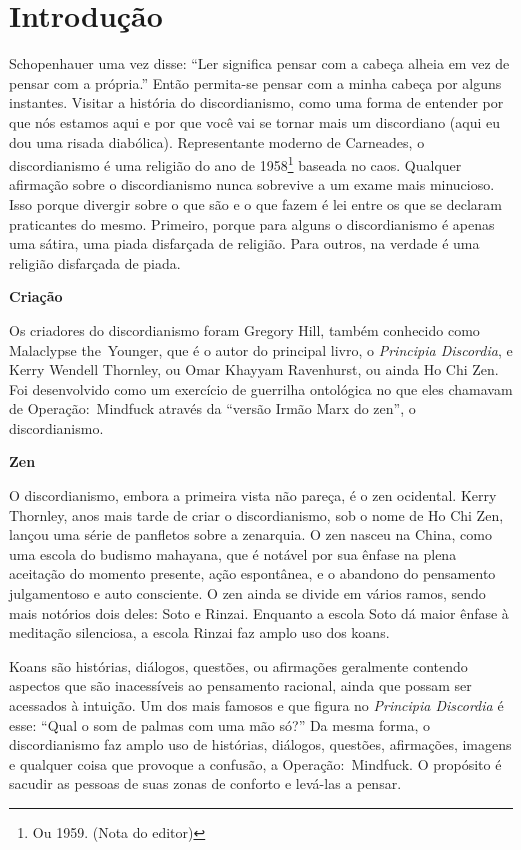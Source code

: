 \newpage
\chapter*{Introdução}

Schopenhauer uma vez disse: ``Ler significa pensar com a cabeça alhe\-ia em vez de pensar com a própria.'' Então permita-se pensar com a minha cabeça por alguns instantes. Visitar a história do discordianismo, como uma forma de entender por que nós estamos aqui e por que você vai se tornar mais um discordiano (aqui eu dou uma risada diabólica). Representante moderno de Carneades, o discordianismo é uma religião do ano de 1958\footnote{Ou 1959. (Nota do editor)} baseada no caos. Qualquer afirmação sobre o discordianismo nunca sobrevive a um exame mais minucioso. Isso porque divergir sobre o que são e o que fazem é lei entre os que se declaram praticantes do mesmo. Primeiro, porque para alguns o discordianismo é apenas uma sátira, uma piada disfarçada de religião. Para outros, na verdade é uma religião disfarçada de piada.
 
\begin{flushleft}
{\Large \textbf{Criação}}
\end{flushleft}

Os criadores do discordianismo foram Gregory Hill, também conhecido como Malaclypse the~Younger, que é o autor do principal livro, o \emph{Principia Discordia}, e Kerry Wendell Thornley, ou Omar Khay\-yam Ravenhurst, ou ainda Ho Chi Zen. Foi desenvolvido como um exercício de guerrilha ontológica no que eles chamavam de Operação:~Mindfuck através da ``versão Irmão Marx do zen'', o discordianismo.

\newpage
\begin{flushleft}
{\Large \textbf{Zen}}
\end{flushleft}

O discordianismo, embora a primeira vista não pareça, é o zen ocidental. Kerry Thornley, anos mais tarde de criar o discordianismo, sob o nome de Ho Chi Zen, lançou uma série de panfletos sobre a zenarquia. O zen nasceu na China, como uma escola do budismo mahayana, que é notável por sua ênfase na plena aceitação do momento presente, ação espontânea, e o abandono do pensamento julgamentoso e auto consciente. O zen ainda se divide em vários ramos, sendo mais notórios dois deles: Soto e Rinzai. Enquanto a escola Soto dá maior ênfase à meditação silenciosa, a escola Rinzai faz amplo uso dos koans.

Koans são histórias, diálogos, questões, ou afirmações geralmente contendo aspectos que são inacessíveis ao pensamento racional, ain\-da que possam ser acessados à intuição. Um dos mais famosos e que figura no \emph{Principia Discordia} é esse: ``Qual o som de palmas com uma mão só?'' Da mesma forma, o discordianismo faz amplo uso de histórias, diálogos, questões, afirmações, imagens e qualquer coisa que provoque a confusão, a Operação:~Mindfuck. O propósito é sacudir as pessoas de suas zonas de conforto e levá-las a pensar.

